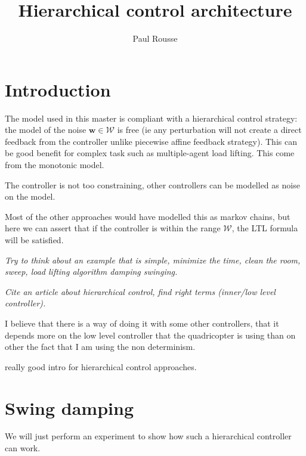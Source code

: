 \documentclass{article}
\theoremstyle{named}
\begin{document}
\title{Hierarchical control architecture}
\author{Paul Rousse}

\maketitle

\section{Introduction}

The model used in this master is compliant with a hierarchical control strategy: the model of the noise $\mathbf{w} \in \mathcal{W}$ is free (ie any perturbation will not create a direct feedback from the controller unlike piecewise affine feedback strategy).
This can be good benefit for complex task such as multiple-agent load lifting.
This come from the monotonic model.

The controller is not too constraining, other controllers can be modelled as noise on the model.

Most of the other approaches would have modelled this as markov chains, but here we can assert that if the controller is within the range $\mathcal{W}$, the LTL formula will be satisfied.

\textit{Try to think about an example that is simple, minimize the time, clean the room, sweep, load lifting algorithm damping swinging.}

\textit{Cite an article about hierarchical control, find right terms (inner/low level controller).}

I believe that there is a way of doing it with some other controllers, that it depends more on the low level controller that the quadricopter is using than on other  the fact that I am using the non determinism.

\cite{liu2014abstraction} really good intro for hierarchical control approaches.

\section{Swing damping}

We will just perform an experiment to show how such a hierarchical controller can work.



{}

\end{document}
